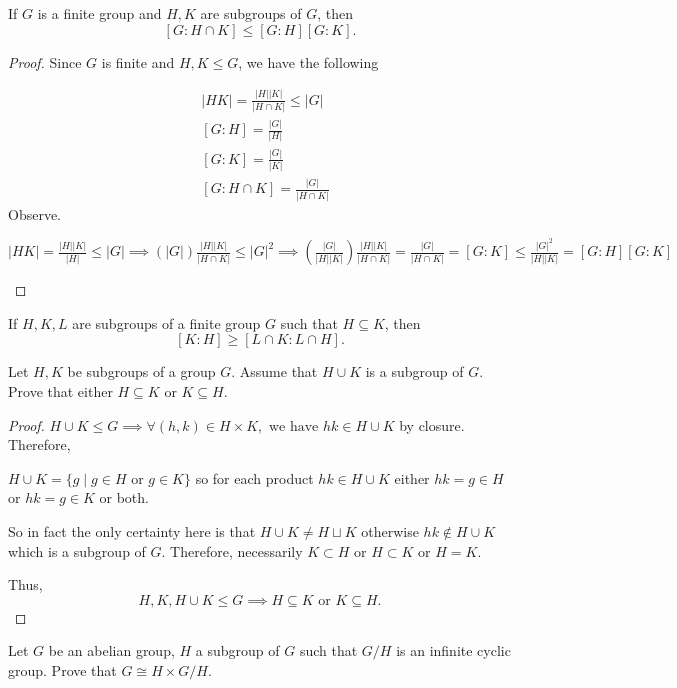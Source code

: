 \documentclass[addpoints,10pt]{exam}
\theoremstyle{plain}
\theoremstyle{definition}
\newtheorem{prob}[thm]{Problem}
\theoremstyle{plain}
\theoremstyle{plain}
\theoremstyle{definition}
\let\oldprob\prob
\let\endoldprob\endprob
\renewenvironment{prob}
  {\begin{singlespace}\oldprob}
  {\endoldprob\end{singlespace}}
\begin{document}
\begin{prob}
If $G$ is a finite group and $H,K$ are subgroups of $G$, then
\[
[G:H\cap K] \le [G:H][G:K].
\]
\end{prob}
\begin{proof}
Since $G$ is finite and $H,K\leq G$, we have the following

\begin{align}
&|HK|=\frac{|H||K|}{|H\cap K|}\leq |G|\\
&[G:H]=\frac{|G|}{|H|}\\
&[G:K]=\frac{|G|}{|K|}\\
&[G:H\cap K]=\frac{|G|}{|H\cap K|}
\end{align}
Observe.
\begin{center}
$|HK|=\frac{|H||K|}{|H|}\leq |G|\implies (|G|)\frac{|H||K|}{|H\cap K|}\leq |G|^{2}\implies (\frac{|G|}{|H||K|})\frac{|H||K|}{|H\cap K|}=\frac{|G|}{|H\cap K|}=[G:K]\leq \frac{|G|^{2}}{|H||K|}=[G:H][G:K]$
\end{center}
\end{proof}
\begin{prob}
If $H,K,L$ are subgroups of a finite group $G$ such that $H\subseteq K$, then
\[
[K:H] \ge [L\cap K : L\cap H].
\]
\end{prob}
\newpage
\begin{prob}
  Let $H,K$ be subgroups of a group $G$. Assume that $H\cup K$ is a subgroup of $G$. Prove that either $H\subseteq K$ or $K\subseteq H$.
\end{prob}

\begin{proof}
  $H\cup K\leq G\implies \forall (h,k)\in H\times K,\text{ we have }hk\in H\cup K$ by closure. Therefore,
  \begin{center} 
    $H\cup K=\{g\mid g\in H\text{ or }g\in K\}$ so for each product $hk\in H\cup K$ either $hk=g\in H$ or $hk=g\in K$ or both.
  \end{center}
  So in fact the only certainty here is that $H\cup K\neq H\sqcup K$ otherwise $hk\notin H\cup K$ which is a subgroup of $G$. Therefore, necessarily $K\subset H$ or $H\subset K$ or $H=K$.

  Thus,
  $$H,K,H\cup K\leq G\implies H\subseteq K\text{ or }K\subseteq H.$$
\end{proof}
\begin{prob}
Let $G$ be an abelian group, $H$ a subgroup of $G$ such that $G/H$ is an infinite cyclic group. Prove that $G \cong H \times G/H$.
\end{prob}
\end{document}
